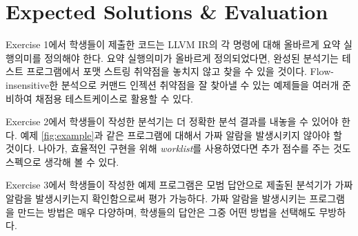 \documentclass[a4paper, 11pt]{article}
\theoremstyle{definition}
\begin{document}
\section{Expected Solutions \& Evaluation}

Exercise 1에서 학생들이 제출한 코드는 LLVM IR의 각 명령에 대해 올바르게 요약
실행의미를 정의해야 한다. 요약 실행의미가 올바르게 정의되었다면, 완성된
분석기는 테스트 프로그램에서 포맷 스트링 취약점을 놓치지 않고 찾을 수 있을
것이다. Flow-insensitive한 분석으로 커맨드 인젝션 취약점을 잘 찾아낼 수 있는
예제들을 여러개 준비하여 채점용 테스트케이스로 활용할 수 있다.

Exercise 2에서 학생들이 작성한 분석기는 더 정확한 분석 결과를 내놓을 수 있어야
한다. 예제 \ref{fig:example}과 같은 프로그램에 대해서 가짜 알람을 발생시키지
않아야 할 것이다. 나아가, 효율적인 구현을 위해 \emph{worklist}\cite{PALecture}를
사용하였다면 추가 점수를 주는 것도 스펙으로 생각해 볼 수 있다.

Exercise 3에서 학생들이 작성한 예제 프로그램은 모범 답안으로 제출된 분석기가
가짜 알람을 발생시키는지 확인함으로써 평가 가능하다. 가짜 알람을 발생시키는
프로그램을 만드는 방법은 매우 다양하며, 학생들의 답안은 그중 어떤 방법을
선택해도 무방하다.



\end{document}
